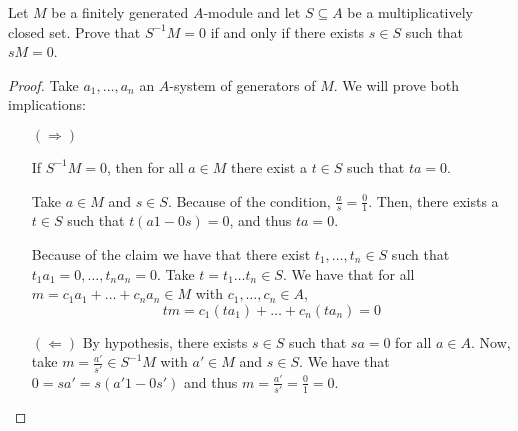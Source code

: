 \begin{problem}
    Let $M$ be a finitely generated $A$-module and let $S \subseteq A$ be a multiplicatively closed set.
    Prove that $S^{-1}M = 0$ if and only if there exists $s \in S$ such that $sM = 0$.
    \begin{sol}
        \begin{proof}
            Take $a_1, \dots, a_n$ an $A$-system of generators of $M$.
            We will prove both implications:
            \begin{itemize}
                \item[$(\Rightarrow)$]
                \begin{claim}
                    If $S^{-1}M = 0$, then for all $a \in M$ there exist a $t \in S$ such that $t a = 0$.
                    \begin{sol}
                        Take $a \in M$ and $s \in S$.
                        Because of the condition, $\frac{a}{s} = \frac{0}{1}$.
                        Then, there exists a $t \in S$ such that $t (a 1 - 0 s) = 0$, and thus $t a = 0$.
                    \end{sol}
                \end{claim}
                Because of the claim we have that there exist $t_1, \dots, t_n \in S$ such that $t_1 a_1 = 0, \dots, t_n a_n = 0$.
                Take $t = t_1 \dots t_n \in S$.
                We have that for all $m = c_1 a_1 + \dots + c_n a_n \in M$ with $c_1, \dots, c_n \in A$,
                \[
                    t m = c_1 (t a_1) + \dots + c_n (t a_n) = 0
                \]
                \item[$(\Leftarrow)$]
                By hypothesis, there exists $s \in S$ such that $s a = 0$ for all $a \in A$.
                Now, take $m = \frac{a'}{s'} \in S^{-1}M$ with $a' \in M$ and $s \in S$.
                We have that $0 = s a' = s (a' 1 - 0 s')$ and thus $m = \frac{a'}{s'} = \frac{0}{1} = 0$.
            \end{itemize}
        \end{proof}
    \end{sol}
\end{problem}